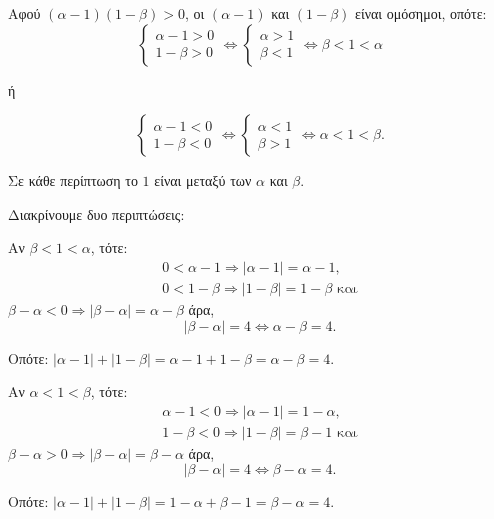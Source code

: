 
\begin{alist}
\item Αφού $(\alpha - 1)(1 - \beta) > 0$, οι $(\alpha - 1)$ και $(1 - \beta)$ είναι ομόσημοι, οπότε:
\[\begin{cases} \alpha - 1 > 0 \\ 1 - \beta > 0 \end{cases} \Leftrightarrow \begin{cases} \alpha > 1 \\ \beta < 1 \end{cases} \Leftrightarrow \beta < 1 < \alpha\]

ή

\[\begin{cases} \alpha - 1 < 0 \\ 1 - \beta < 0 \end{cases} \Leftrightarrow \begin{cases} \alpha < 1 \\ \beta > 1 \end{cases} \Leftrightarrow \alpha < 1 < \beta.\]

Σε κάθε περίπτωση το $1$ είναι μεταξύ των $\alpha$ και $\beta$.

\item Διακρίνουμε δυο περιπτώσεις:
\begin{rlist}
\item Αν $\beta < 1 < \alpha$, τότε:
\begin{gather*}
0 < \alpha - 1 \Rightarrow |\alpha - 1| = \alpha - 1, \\
0 < 1 - \beta \Rightarrow |1 - \beta| = 1 - \beta\text{ και}
\end{gather*}
$\beta - \alpha < 0 \Rightarrow |\beta - \alpha| = \alpha - \beta$ άρα,
\[|\beta - \alpha| = 4 \Leftrightarrow \alpha - \beta = 4.\]

Οπότε: $|\alpha - 1| + |1 - \beta| = \alpha - 1 + 1 - \beta = \alpha - \beta = 4$.

\item Αν $\alpha < 1 < \beta$, τότε:
\begin{gather*}
\alpha - 1 < 0 \Rightarrow |\alpha - 1| = 1 - \alpha, \\
1 - \beta < 0 \Rightarrow |1 - \beta| = \beta - 1\text{ και}
\end{gather*}
$\beta - \alpha > 0 \Rightarrow |\beta - \alpha| = \beta - \alpha$ άρα,
\[|\beta - \alpha| = 4 \Leftrightarrow \beta - \alpha = 4.\]

Οπότε: $|\alpha - 1| + |1 - \beta| = 1 - \alpha + \beta - 1 = \beta - \alpha = 4$.
\end{rlist}
\end{alist}

